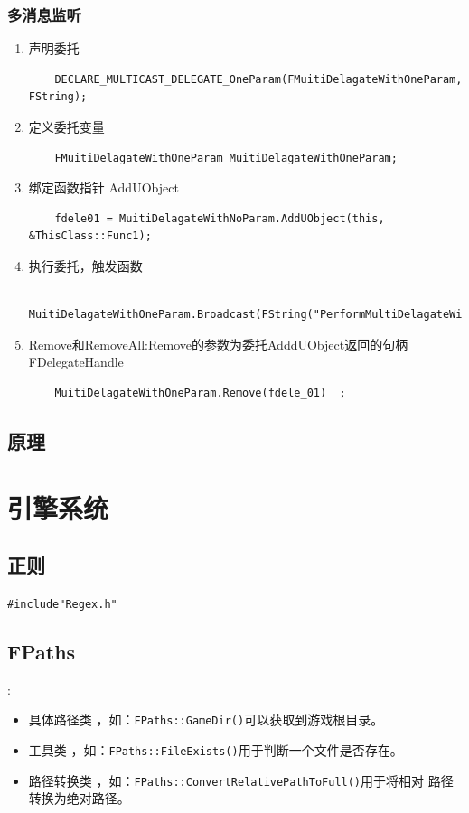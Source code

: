 \documentclass[UTF8,a4paper,12pt]{ctexbook}
\begin{document}
		
		\subsection{多消息监听}
			\begin{enumerate}
				\item 声明委托
				\begin{lstlisting}
	DECLARE_MULTICAST_DELEGATE_OneParam(FMuitiDelagateWithOneParam, FString);			
				\end{lstlisting}				
				\item 定义委托变量
				\begin{lstlisting}
	FMuitiDelagateWithOneParam MuitiDelagateWithOneParam;				
				\end{lstlisting}				
				\item 绑定函数指针 AddUObject
				\begin{lstlisting}
	fdele01 = MuitiDelagateWithNoParam.AddUObject(this, &ThisClass::Func1);				
				\end{lstlisting}				
				\item 执行委托，触发函数
				\begin{lstlisting}
	MuitiDelagateWithOneParam.Broadcast(FString("PerformMultiDelagateWithOneParam"));				
				\end{lstlisting}	
				
				\item Remove和RemoveAll:Remove的参数为委托AdddUObject返回的句柄FDelegateHandle
				\begin{lstlisting}
	MuitiDelagateWithOneParam.Remove(fdele_01)	;			
				\end{lstlisting}							
			\end{enumerate}
	
	\section{原理}



\chapter{引擎系统}
	\section{正则}
		\verb|#include"Regex.h"|
	
	\section{FPaths}:
		\begin{itemize}
			\item 具体路径类 ，如：\verb|FPaths::GameDir()|可以获取到游戏根目录。
			\item 工具类 ，如：\verb|FPaths::FileExists()|用于判断一个文件是否存在。
			\item 路径转换类 ，如：\verb|FPaths::ConvertRelativePathToFull()|用于将相对 路径转换为绝对路径。
		\end{itemize}
	
\end{document}

